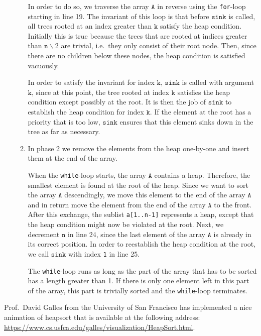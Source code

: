 \begin{enumerate}
\begin{enumerate}
            In order to do so, we traverse the array $\texttt{A}$ in reverse using the
            \texttt{for}-loop starting in line 19.  The invariant of this loop is that before
            $\texttt{sink}$ is called, all trees rooted at an index greater than
            $\texttt{k}$ satisfy the heap condition.  Initially this is true because the trees that
            are rooted at indices greater than $\texttt{n}\backslash 2$ are trivial, i.e.~they only
            consist of their root node.  Then, since there are no children below these nodes, the heap
            condition is satisfied vacuously. 
            
            In order to satisfy the invariant for index $\texttt{k}$, $\texttt{sink}$ is called with
            argument $\texttt{k}$,  since at this point, the tree rooted at index $\texttt{k}$ satisfies
            the heap condition except possibly at the root.  It is then the job of $\texttt{sink}$ to
            establish the heap condition for index $\texttt{k}$.  If the element at the root has a
            priority that is too low, $\texttt{sink}$ ensures that this element sinks down in the tree
            as far as necessary.
      \item In phase 2 we remove the elements from the heap one-by-one and insert them at the end of
            the array.

            When the \texttt{while}-loop starts, the array $\texttt{A}$ contains a heap.  Therefore,
            the smallest element is found at the root of the heap.  Since we want to sort the
            array $\texttt{A}$ descendingly, we move this element to the end of the array $\texttt{A}$ and in
            return move the element from the end of the array $\texttt{A}$ to the front.
            After this exchange, the sublist \texttt{a[1..n-1]} represents a heap, except that the
            heap condition might now be violated at the root.  Next, we decrement $\texttt{n}$ in line 24, since the
            last element of the array $\texttt{A}$ is already in its correct position.  
            In order to reestablish the heap condition at the root, we call $\texttt{sink}$ with index
            \texttt{1} in line 25.

            The \texttt{while}-loop runs as long as the part of the array that has to be sorted has
            a length greater than 1.  If there is only one element left in this part of the array, this part is
            trivially sorted and the \texttt{while}-loop terminates.
      \end{enumerate}
\end{enumerate}
Prof.~David Galles from the University of San Francisco has implemented a nice animation of heapsort that is
available at the following address:
\\[0.2cm]
\hspace*{1.3cm}
\href{https://www.cs.usfca.edu/~galles/visualization/HeapSort.html}{https://www.cs.usfca.edu/galles/visualization/HeapSort.html}.
\\[0.2cm] 
